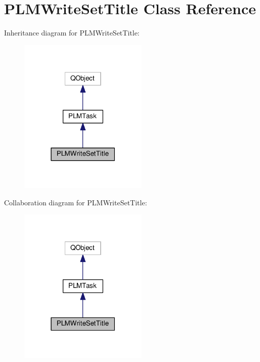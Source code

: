 \hypertarget{class_p_l_m_write_set_title}{}\section{P\+L\+M\+Write\+Set\+Title Class Reference}
\label{class_p_l_m_write_set_title}


Inheritance diagram for P\+L\+M\+Write\+Set\+Title\+:\nopagebreak
\begin{figure}[H]
\begin{center}
\leavevmode
\includegraphics[width=174pt]{class_p_l_m_write_set_title__inherit__graph}
\end{center}
\end{figure}


Collaboration diagram for P\+L\+M\+Write\+Set\+Title\+:\nopagebreak
\begin{figure}[H]
\begin{center}
\leavevmode
\includegraphics[width=174pt]{class_p_l_m_write_set_title__coll__graph}
\end{center}
\end{figure}
